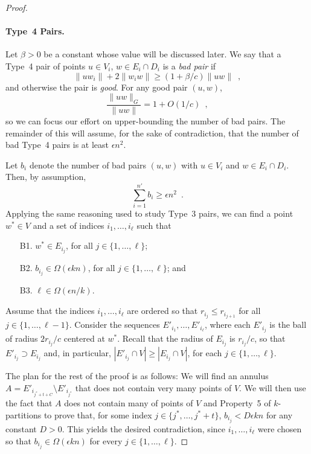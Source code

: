 \documentclass{patmorin}
\begin{document}
\begin{proof}
  \paragraph{Type~4 Pairs.}  
  Let $\beta > 0$ be a constant whose value will be discussed later.
  We say that a Type~4 pair of points $u\in V_i$, $w\in E_i\cap D_i$ is
  a \emph{bad pair} if
  \[
      \|uw_i\|+2\|w_iw\| \ge (1+\beta/c)\|uw\| \enspace ,
  \]
  and otherwise the pair is \emph{good}.
  For any good pair $(u,w)$,
  \[
    \frac{\|uw\|_G}{\|uw\|} = 1+O(1/c) \enspace ,
  \]
  so we can focus our effort on upper-bounding the number of bad pairs.
  The remainder of this will assume, for the sake of contradiction,
  that the number of bad Type~4 pairs is at least $\epsilon n^2$.

  Let $b_i$ denote the number of bad pairs $(u,w)$ with $u\in V_i$
  and $w\in E_i\cap D_i$.  Then, by assumption,
  \[
    \sum_{i=1}^{n'} b_i \ge \epsilon n^2 \enspace .
  \]
  Applying the same reasoning used to study Type~3 pairs, we can find a
  point $w^*\in V$ and a set of indices $i_1,\ldots,i_{\ell}$ such that
  \begin{enumerate}\label{w-star}
    \item[B1.] $w^*\in E_{i_j}$, for all $j\in\{1,\ldots,\ell\}$;
    \item[B2.] $b_{i_j} \in \Omega(\epsilon kn)$, for all 
       $j\in\{1,\ldots,\ell\}$; and
    \item[B3.] $\ell\in \Omega(\epsilon n/k)$.
  \end{enumerate}

  Assume that the indices $i_1,\ldots,i_\ell$ are ordered so that
  $r_{i_j}\le r_{i_{j+1}}$ for all $j\in\{1,\ldots,\ell-1\}$.  Consider
  the sequences $E'_{i_1},\ldots,E'_{i_\ell}$, where each $E'_{i_j}$
  is the ball of radius $2r_{i_j}/c$ centered at $w^*$. Recall that the
  radius of $E_{i_j}$ is $r_{i_j}/c$, so that $E'_{i_j}\supset E_{i_j}$
  and, in particular, $|E'_{i_j}\cap V|\ge |E_{i_j}\cap V|$, for each
  $j\in\{1,\ldots,\ell\}$.

  The plan for the rest of the proof is as follows:  We will find an
  annulus $A=E'_{i_{j^*+t+C}}\setminus E'_{i_{j^*}}$ that does not contain
  very many points of $V$.  We will then use the fact that $A$ does not
  contain many of points of $V$ and Property~5 of $k$-partitions to prove
  that, for some index $j\in\{j^*,\ldots,j^*+t\}$, $b_{i_j}< D\epsilon kn$
  for any constant $D>0$.  This yields the desired contradiction, since
  $i_1,\ldots,i_\ell$ were chosen so that $b_{i_j}\in\Omega(\epsilon k n)$
  for every $j\in\{1,\ldots,\ell\}$.


\end{proof}
\end{document}
